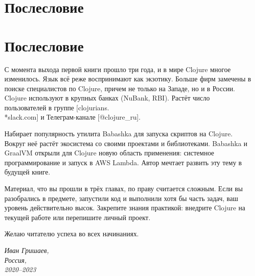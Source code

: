 
\ifprint
\chapter{Послесловие}
\else
\chapter*{Послесловие}
\fi

С момента выхода первой книги прошло три года, и в мире Clojure многое
изменилось. Язык всё реже воспринимают как экзотику. Больше фирм замечены в
поиске специалистов по Clojure, причем не только на Западе, но и в России. Clojure
используют в крупных банках (NuBank, RBI). Растёт число пользователей в группе
[clojurians.\\*slack.com]
и Телеграм-канале [@clo\-ju\-re\_ru].



Набирает популярность утилита Babashka для запуска скриптов на Clojure. Вокруг
неё растёт экосистема со своими проектами и библиотеками. Babashka и GraalVM
открыли для Clojure новую область применения: системное программирование и
запуск в AWS Lambda. Автор мечтает развить эту тему в будущей книге.


Материал, что вы прошли в трёх главах, по праву считается сложным. Если вы
разобрались в предмете, запустили код и выполнили хотя бы часть задач, ваш
уровень действительно высок. Закрепите знания практикой: внедрите Clojure на
текущей работе или перепишите личный проект.

Желаю читателю успеха во всех начинаниях.

\vspace{1em}

\noindent

\hspace{\fill}\parbox{4cm}{\textit{Иван Гришаев,\\Россия,\\2020--2023}}
